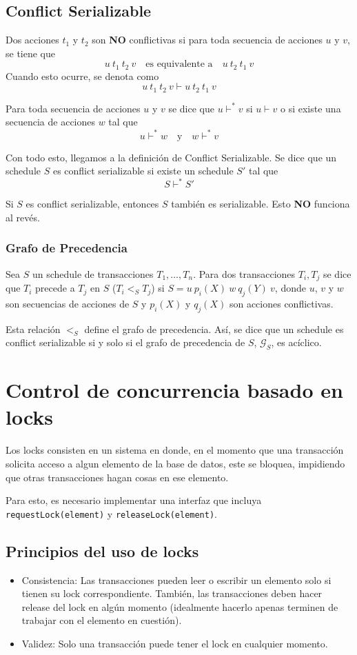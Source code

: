 \subsection{Conflict Serializable}
Dos acciones $t_1$ y $t_2$ son \textbf{NO} conflictivas si para toda secuencia de acciones $u$ y $v$, se tiene que
\[ u\ t_1\ t_2\ v \quad \text{es equivalente a} \quad u\ t_2\ t_1\ v \]
Cuando esto ocurre, se denota como
\[ u\ t_1\ t_2\ v \vdash u\ t_2\ t_1\ v \]

Para toda secuencia de acciones $u$ y $v$ se dice que $u \vdash^* v$ si $u \vdash v$ o si existe una secuencia de acciones $w$ tal que
\[ u \vdash^* w \quad \text{y} \quad w \vdash^* v \]

Con todo esto, llegamos a la definición de Conflict Serializable. Se dice que un schedule $S$ es conflict serializable si existe un schedule $S'$ tal que
\[ S \vdash^* S' \]

Si $S$ es conflict serializable, entonces $S$ también es serializable. Esto \textbf{NO} funciona al revés.

\subsubsection{Grafo de Precedencia}
Sea $S$ un schedule de transacciones $T_1, \ldots, T_n$. Para dos transacciones $T_i, T_j$ se dice que $T_i$ precede a $T_j$ en $S$ ($T_i <_S T_j$) si $S = u\ p_i(X)\ w\ q_j(Y)\ v$, donde $u$, $v$ y $w$ son secuencias de acciones de $S$ y $p_i(X)$ y $q_j(X)$ son acciones conflictivas.

Esta relación $<_S$ define el grafo de precedencia. Así, se dice que un schedule es conflict serializable si y solo si el grafo de precedencia de $S$, $\mathcal{G}_S$, es acíclico.

\section{Control de concurrencia basado en locks}
Los locks consisten en un sistema en donde, en el momento que una transacción solicita acceso a algun elemento de la base de datos, este se bloquea, impidiendo que otras transacciones hagan cosas en ese elemento.

Para esto, es necesario implementar una interfaz que incluya \texttt{requestLock(element)} y \texttt{releaseLock(element)}.

\subsection{Principios del uso de locks}
\begin{itemize}
  \item Consistencia: Las transacciones pueden leer o escribir un elemento solo si tienen su lock correspondiente. También, las transacciones deben hacer release del lock en algún momento (idealmente hacerlo apenas terminen de trabajar con el elemento en cuestión).
  \item Validez: Solo una transacción puede tener el lock en cualquier momento.
\end{itemize}

